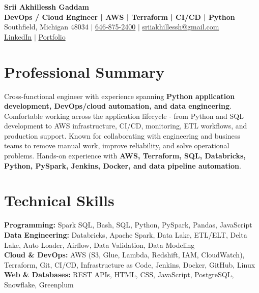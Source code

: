 \documentclass[letterpaper,10pt]{article}
\begin{document}
\fontsize{9.35pt}{10.45pt}\selectfont

\begin{center}
    {\LARGE \textbf{Srii Akhillessh Gaddam}} \\[-1pt]
    \textbf{DevOps / Cloud Engineer | AWS | Terraform | CI/CD | Python} \\[2pt]
    Southfield, Michigan 48034 $|$
    \href{tel:6468752400}{646-875-2400} $|$
    \href{mailto:sriiakhillessh@gmail.com}{sriiakhillessh@gmail.com} \\[1pt]
    \href{https://www.linkedin.com/in/srii-akhiilessh-gaddam-b48668191/}{LinkedIn} $|$
    \href{https://sriiakhillesshg.github.io/portfolio/}{Portfolio}
\end{center}
\vspace{-8pt}

\section{Professional Summary}
\small{Cross-functional engineer with experience spanning \textbf{Python application development, DevOps/cloud automation, and data engineering}. Comfortable working across the application lifecycle - from Python and SQL development to AWS infrastructure, CI/CD, monitoring, ETL workflows, and production support. Known for collaborating with engineering and business teams to remove manual work, improve reliability, and solve operational problems. Hands-on experience with \textbf{AWS, Terraform, SQL, Databricks, Python, PySpark, Jenkins, Docker, and data pipeline automation}.}

\section{Technical Skills}
\small{
\textbf{Programming:} Spark SQL, Bash, SQL, Python, PySpark, Pandas, JavaScript \\
\textbf{Data Engineering:} Databricks, Apache Spark, Data Lake, ETL/ELT, Delta Lake, Auto Loader, Airflow, Data Validation, Data Modeling \\
\textbf{Cloud \& DevOps:} AWS (S3, Glue, Lambda, Redshift, IAM, CloudWatch), Terraform, Git, CI/CD, Infrastructure as Code, Jenkins, Docker, GitHub, Linux \\
\textbf{Web \& Databases:} REST APIs, HTML, CSS, JavaScript, PostgreSQL, Snowflake, Greenplum
}
\end{document}
